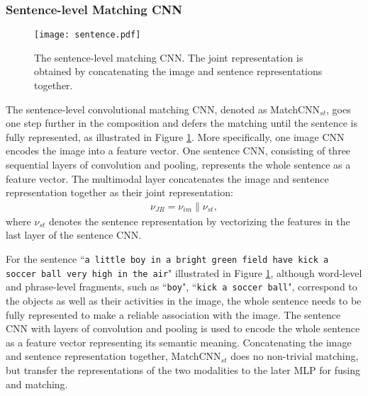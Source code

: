 \documentclass[10pt,twocolumn,letterpaper]{article}
\begin{document}
\subsubsection{Sentence-level Matching CNN}
\label{sec_sentence}

\begin{figure}[t]
\begin{center}
   \texttt{[image: sentence.pdf]}

\end{center}
   \caption{The sentence-level matching CNN. The joint representation is obtained by concatenating the image and sentence representations together.}
\label{fig:sentence}
\end{figure}


The sentence-level convolutional  matching CNN, denoted as MatchCNN$_{st}$, goes one step further in the composition and defers the matching  until the sentence is fully represented, as illustrated in Figure \ref{fig:sentence}. More specifically, one image CNN encodes the image into a feature vector. One sentence CNN, consisting of three sequential layers of convolution and pooling, represents the whole sentence as a feature vector. The multimodal layer concatenates the image and sentence representation together as their joint representation:
\begin{equation}
\label{eq_word_image_concatenation}
\begin{split}
{\nu_{JR}} = \nu_{im} \parallel \nu_{st},
\end{split}
\end{equation}
where $\nu_{st}$ denotes the sentence representation by vectorizing the features in the last layer of the sentence CNN.

For the sentence ``\texttt{\small a little boy in a bright green field have kick a soccer ball very high in the air}" illustrated in Figure \ref{fig:sentence}, although word-level and phrase-level fragments, such as ``\texttt{\small boy}", ``\texttt{\small kick a soccer ball}", correspond to the objects  as well as  their activities in the image, the whole sentence needs to be fully represented to make a reliable association with the image. The sentence CNN with layers of convolution and pooling is used to encode the whole sentence as a feature vector representing its semantic meaning. Concatenating the image and sentence representation together,  MatchCNN$_{st}$ does no non-trivial matching, but transfer the representations of the two modalities to the later MLP for fusing and matching.
\end{document}
